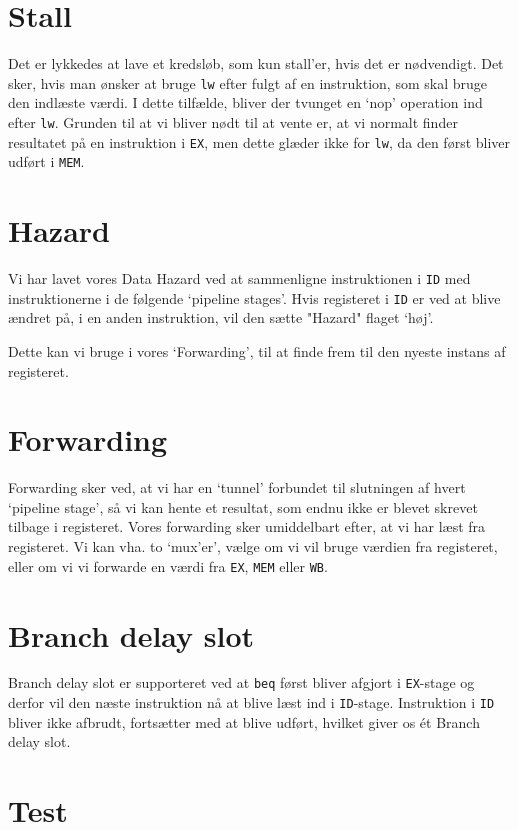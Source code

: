 \documentclass[12pt, a4paper]{article}
\begin{document}
\section{Stall}
Det er lykkedes at lave et kredsløb, som kun stall'er, hvis det er nødvendigt. Det sker, hvis man ønsker at bruge \texttt{lw} efter fulgt af en instruktion, som skal bruge den indlæste værdi. I dette tilfælde, bliver der tvunget en `nop' operation ind efter \texttt{lw}. Grunden til at vi bliver nødt til at vente er, at vi normalt finder resultatet på en instruktion i \texttt{EX}, men dette glæder ikke for \texttt{lw}, da den først bliver udført i \texttt{MEM}.

\section{Hazard}

Vi har lavet vores Data Hazard ved at sammenligne instruktionen i \texttt{ID} med instruktionerne i de følgende `pipeline stages'. Hvis registeret i \texttt{ID} er ved at blive ændret på, i en anden instruktion, vil den sætte "Hazard" flaget `høj'.

Dette kan vi bruge i vores `Forwarding', til at finde frem til den nyeste instans af registeret.


\section{Forwarding}

Forwarding sker ved, at vi har en `tunnel' forbundet til slutningen af hvert `pipeline stage', så vi kan hente et resultat, som endnu ikke er blevet skrevet tilbage i registeret. Vores forwarding sker umiddelbart efter, at vi har læst fra registeret. Vi kan vha. to `mux'er', vælge om vi vil bruge værdien fra registeret, eller om vi vi forwarde en værdi fra \texttt{EX}, \texttt{MEM} eller \texttt{WB}.


\section{Branch delay slot}
Branch delay slot er supporteret ved at \texttt{beq} først bliver afgjort i \texttt{EX}-stage og derfor vil den næste instruktion nå at blive læst ind i \texttt{ID}-stage. Instruktion i \texttt{ID} bliver ikke afbrudt, fortsætter med at blive udført, hvilket giver os ét Branch delay slot.


\section{Test}
\end{document}
